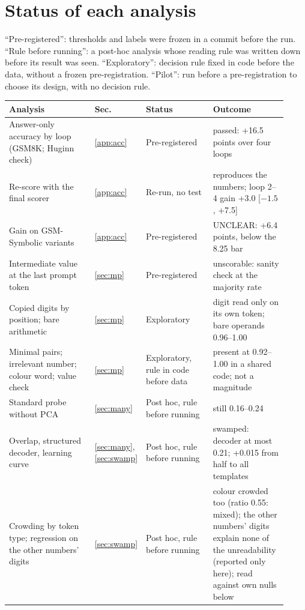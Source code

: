 \documentclass{article}
\begin{document}
\section{Status of each analysis}\label{app:status}

``Pre-registered'': thresholds and labels were frozen in a commit before the run. ``Rule before running'': a post-hoc analysis whose reading rule was written down before its result was seen. ``Exploratory'': decision rule fixed in code before the data, without a frozen pre-registration. ``Pilot'': run before a pre-registration to choose its design, with no decision rule.

{\small
\begin{longtable}{@{}L{0.33\linewidth}L{0.06\linewidth}L{0.25\linewidth}L{0.28\linewidth}@{}}
\toprule
Analysis & Sec. & Status & Outcome \\
\midrule
\endhead
Answer-only accuracy by loop (GSM8K; Huginn check) & \ref{app:acc} & Pre-registered & passed: +16.5 points over four loops \\
Re-score with the final scorer & \ref{app:acc} & Re-run, no test & reproduces the numbers; loop 2--4 gain +3.0 [$-1.5$, +7.5] \\
Gain on GSM-Symbolic variants & \ref{app:acc} & Pre-registered & UNCLEAR: +6.4 points, below the 8.25 bar \\
Intermediate value at the last prompt token & \ref{sec:mp} & Pre-registered & unscorable: sanity check at the majority rate \\
Copied digits by position; bare arithmetic & \ref{sec:mp} & Exploratory & digit read only on its own token; bare operands 0.96--1.00 \\
Minimal pairs; irrelevant number; colour word; value check & \ref{sec:mp} & Exploratory, rule in code before data & present at 0.92--1.00 in a shared code; not a magnitude \\
Standard probe without PCA & \ref{sec:many} & Post hoc, rule before running & still 0.16--0.24 \\
Overlap, structured decoder, learning curve & \ref{sec:many}, \ref{sec:swamp} & Post hoc, rule before running & swamped: decoder at most 0.21; +0.015 from half to all templates \\
Crowding by token type; regression on the other numbers' digits & \ref{sec:swamp} & Post hoc, rule before running & colour crowded too (ratio 0.55: mixed); the other numbers' digits explain none of the unreadability (reported only here); read against own nulls below \\

\end{longtable}}
\end{document}
